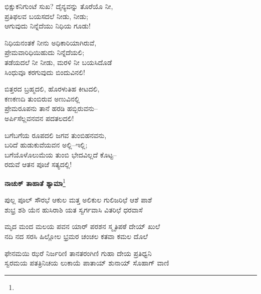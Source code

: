 \begin{myquote}
ಭಿಕ್ಷುಕನಿಗುಂಟೆ ಸುಖ? ದೈನ್ಯವನ್ನು ತೊರೆಯೊ ನೀ,\\ಪ್ರತಿಫಲವ ಬಯಸದಲೆ ನೀಡು, ನೀಡು;\\ಆಗುವುದು ನಿನ್ನೆದೆಯು ನಿಧಿಯ ಗೂಡು!
\end{myquote}

\begin{myquote}
ನಿಧಿಯನಂತಕೆ ನೀನು ಅಧಿಕಾರಿಯಾಗಿರುವೆ,\\ಪ್ರೇಮವಾರಿಧಿಯಿಹುದು ನಿನ್ನೆದೆಯಲಿ;\\ತಡೆಯದಲೆ ನೀ ನೀಡು, ಮರಳಿ ನೀ ಬಯಸಿದೊಡೆ\\ಸಿಂಧುವೂ ಕರಗುವುದು ಬಿಂದುವಿನಲಿ!
\end{myquote}

\begin{myquote}
ಬಿತ್ತರದ ಬ್ರಹ್ಮದಲಿ, ಹೊರಳುತಿಹ ಕೀಟದಲಿ,\\ಕಣಕಣದಿ ತುಂಬಿರುವ ಅಣುವಿನಲ್ಲಿ\\ಪ್ರೇಮರೂಪನು ತಾನೆ ಹರಡಿ ಹಬ್ಬಿರುವನು–\\ಅರ್ಪಿಸೆಲ್ಲವನವನ ಪದತಲದಲಿ!
\end{myquote}

\begin{myquote}
ಬಗೆಬಗೆಯ ರೂಪದಲಿ ಜಗವ ತುಂಬಿಹನವನು,\\ಬರಿದೆ ಹುಡುಕುವೆಯವನ ಅಲ್ಲಿ–ಇಲ್ಲಿ;\\ಬಗೆಯೊಳೊಲುಮೆಯ ತುಂಬಿ ಭೇದವಿಲ್ಲದೆ ಕೊಟ್ಟ–\\ರದುವೆ ಆತನ ಪೂಜೆ ಸತ್ಯದಲ್ಲಿ!
\end{myquote}

\begin{center}
\textbf{ನಾಚುಕ್ ತಾಹಾತೆ ಶ್ಯಾಮಾ}\footnote{}
\end{center}

\begin{myquote}
ಪುಲ್ಲ ಪೂಲ್ ಸೌರಭೆ ಆಕುಲ ಮತ್ತ ಅಲಿಕುಲ ಗುಲಿಜರಿಛೆ ಆಶೆ ಪಾಶೆ\\ಶುಭ್ರ ಶಶಿ ಯೆನ ಹುಸಿರಾಶಿ ಯತ ಸ್ವರ್ಗವಾಸಿ ವಿತರಿಛೆ ಧರವಾಸೆ
\end{myquote}


\begin{myquote}
ಮೃದ ಮಂದ ಮಲಯ ಪವನ ಯಾರ್ ಪರಶನ ಸ್ಮೃತಿಪಠೆ ದೇಯ್ ಖುಲೆ\\ನದಿ ನದ ಸರಸಿ ಹಿಲ್ಲೋಲ ಭ್ರಮರ ಚಂಚಲ ಕತವಾ ಕಮಲ ದೊಲೆ
\end{myquote}


\begin{myquote}
ಫೇನಮಯಿ ಝರೆ ನಿರ್ಜರಿಣಿ ತಾನತರಂಗಿಣಿ ಗುಹಾ ದೇಯ ಪ್ರತಿಧ್ವನಿ\\ಸ್ವರಮಯ ಪತತ್ರಿನಿಚಯ ಲುಕಾಯೆ ಪಾತಾಯ್ ಶುನಾಯ್ ಸೊಹಾಗ್ ವಾಣಿ
\end{myquote}

